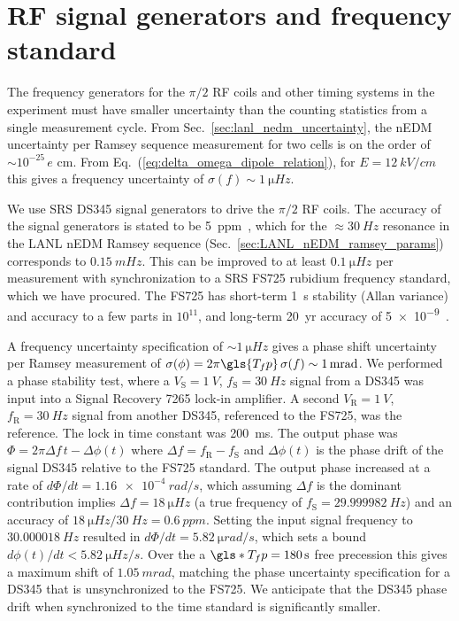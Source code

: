 
\section{RF signal generators and frequency standard}\label{sec:pulse_gen_freq_std}


The frequency generators for the $\pi/2$ RF coils and other timing systems in the experiment must have smaller uncertainty than the counting statistics from a single measurement cycle. From Sec.~\ref{sec:lanl_nedm_uncertainty}, the nEDM uncertainty per Ramsey sequence measurement for two cells is on the order of $\sim 10^{-25}\,e\text{ cm}$. From Eq.~(\ref{eq:delta_omega_dipole_relation}), for $E=\qty{12}{kV\per cm}$ this gives a frequency uncertainty of $\sigma(f)\sim \qty{1}{\micro Hz}$.

We use SRS DS345 signal generators to drive the $\pi/2$ RF coils. The accuracy of the signal generators is stated to be \qty{5}{ppm}~\cite{ds345_manual}, which for the $\approx\qty{30}{Hz}$ resonance in the LANL nEDM Ramsey sequence (Sec.~\ref{sec:LANL_nEDM_ramsey_params}) corresponds to $\qty{0.15}{mHz}$. This can be improved to at least $\qty{0.1}{\micro Hz}$ per measurement with synchronization to a SRS FS725 rubidium frequency standard, which we have procured. The FS725 has short-term \qty{1}{s} stability (Allan variance) and accuracy to a few parts in $10^{11}$, and long-term \qty{20}{yr} accuracy of \num{5e-9}~\cite{rubidium_standard_fs725_manual}.

A frequency uncertainty specification of $\sim \qty{1}{\micro Hz}$ gives a phase shift uncertainty per Ramsey measurement of $\sigma(\phi)=2\pi\gls{T_fp}\,\sigma(f)\sim \qty{1}{mrad}$. We performed a phase stability test, where a $V_\text{S}=\qty{1}{V}$, $f_\text{S}=\qty{30}{Hz}$ signal from a DS345 was input into a Signal Recovery 7265 lock-in amplifier. A second $V_\text{R}=\qty{1}{V}$, $f_\text{R}=\qty{30}{Hz}$ signal from another DS345, referenced to the FS725, was the reference. The lock in time constant was \qty{200}{ms}. The output phase was $\Phi=2\pi \Delta f\,t-\Delta\phi(t)$ where $\Delta f=f_\text{R}-f_\text{S}$ and $\Delta\phi(t)$ is the phase drift of the signal DS345 relative to the FS725 standard. The output phase increased at a rate of $d\Phi/dt=\qty{1.16e-4}{rad\per s}$, which assuming $\Delta f$ is the dominant contribution implies $\Delta f=\qty{18}{\micro Hz}$ (a true frequency of $f_\text{S}=\qty{29.999982}{Hz}$) and an accuracy of $\qty{18}{\micro Hz}/\qty{30}{Hz}=\qty{0.6}{ppm}$. Setting the input signal frequency to $\qty{30.000018}{Hz}$ resulted in $d\Phi/dt=\qty{5.82}{\micro rad\per s}$, which sets a bound $d\phi(t)/dt<\qty{5.82}{\micro Hz\per s}$. Over the a $\gls*{T_fp}=\qty{180}{s}$ free precession this gives a maximum shift of $\qty{1.05}{mrad}$, matching the phase uncertainty specification for a DS345 that is unsynchronized to the FS725. We anticipate that the DS345 phase drift when synchronized to the time standard is significantly smaller.


